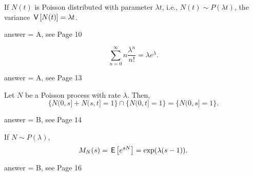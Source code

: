 \begin{exercise}[201802]
If $N(t)$ is Poisson distributed with parameter $\lambda t$, i.e., $N(t) \sim P(\lambda t)$, the variance $\,\mathsf{V}\left[N(t)\right] = \lambda t$. 
\begin{solution}
answer = A, see Page 10
\end{solution}
\end{exercise}

\begin{exercise}[201802]
\begin{equation*}
\sum_{n=0}^\infty n \frac{\lambda^n}{n!} = \lambda e^{\lambda}.
\end{equation*}
\begin{solution}
answer = A, see Page 13
\end{solution}
\end{exercise}

\begin{exercise}[201802]
Let $N$ be a Poisson process with rate $\lambda$. Then,
  \begin{equation*}
\{N(0,s]+N(s,t]=1\}\cap\{N(0,t]=1\} = \{N(0,s]=1\}.
  \end{equation*}
\begin{solution}
answer = B, see Page 14
\end{solution}
\end{exercise}

\begin{exercise}[201802]
If $N\sim P(\lambda)$, 
\begin{equation*}
M_{N}(s) = \,\mathsf{E}\left[e^{s N}\right] =\exp(\lambda(s - 1)).
\end{equation*}

\begin{solution}
answer = B, see Page 16
\end{solution}
\end{exercise}


